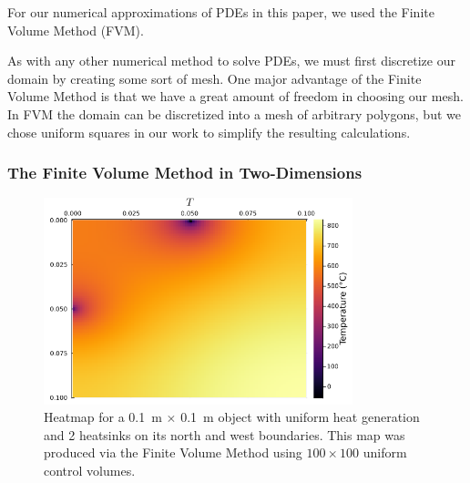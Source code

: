 For our numerical approximations of PDEs in this paper, we used the Finite Volume Method (FVM).

As with any other numerical method to solve PDEs, we must first discretize our domain by creating some sort of mesh. One major advantage of the Finite Volume Method is that we have a great amount of freedom in choosing our mesh. In FVM the domain can be discretized into a mesh of arbitrary polygons, but we chose uniform squares in our work to simplify the resulting calculations.

\subsubsection{The Finite Volume Method in Two-Dimensions}

\begin{figure}
	\centering
	\includegraphics[width=0.8\textwidth]{Chapter_I_Background/Images/T-Heatmap_2_Heatsinks.png}
	\caption[Heatmap Example]{Heatmap for a \SI{0.1}{\meter} $\times$ \SI{0.1}{\meter} object with uniform heat generation and 2 heatsinks on its north and west boundaries. This map was produced via the Finite Volume Method using $100\times 100$ uniform control volumes.}
\end{figure}